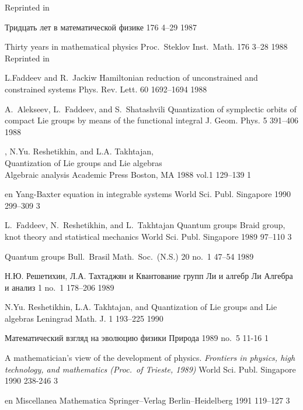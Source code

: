 Reprinted in 

{\LD}
{Тридцать лет в математической физике}
{\Trudy} {176} {} {4--29} {1987}

{\LF}
{Thirty years in mathematical physics}
{Proc.\ Steklov Inst.\ Math.} {176} {3--28} {1988} \\
Reprinted in 

{L.Faddeev and R.~Jackiw}
{Hamiltonian reduction of unconstrained and constrained systems}
{Phys. Rev. Lett.} {60} {} {1692--1694} {1988}

{A.~Alekseev, L.~Faddeev, and S.~Shatashvili}
{Quantization of symplectic orbits of compact {L}ie groups by means of
  the functional integral}
{J. Geom. Phys.} {5} {} {391--406} {1988}

{\LF, N.Yu. Reshetikhin, and L.A. Takhtajan,}\\
{Quantization of Lie groups and Lie algebras} \\
{Algebraic analysis} {Academic Press} {Boston, MA} {1988} {vol.1}
 {129--139} {1}

{en}
{Yang-Baxter equation in integrable systems}
{World Sci. Publ.} {Singapore} {1990} {} {299--309} {3}

{L.~Faddeev, N.~Reshetikhin, and L.~Takhtajan} 
{Quantum groups}
{Braid group, knot theory and statistical mechanics}
{World Sci. Publ.} {Singapore} {1989} {} {97--110} {3}

{\LF}
{Quantum groups}
{Bull.\ Brasil Math.\ Soc.\ (N.S.)} {20} {no.~1} {47--54} {1989} 

{Н.Ю. Решетихин, Л.А. Тахтаджян и \LD}
{Квантование групп Ли и алгебр Ли}
{Алгебра и анализ} {1} {no.~1} {178--206} {1989}

{N.Yu. Reshetikhin, L.A. Takhtajan, and \LF}
{Quantization of {L}ie groups and {L}ie algebras}
{Leningrad Math. J.} {1} {193--225} {1990}

{\LD}
{Математический взгляд на эволюцию физики}
{Природа} {} {} {1989} {no.~5} {11-16} {1}

{\LF}
{A mathematician's view of the development of physics.}  
{\em Frontiers in physics, high technology, and mathematics (Proc.\ of Trieste, 1989)}
{World Sci. Publ.} {Singapore} {1990} {} {238-246} {3}

{en}
{Miscellanea Mathematica} {Springer--Verlag} {Berlin--Heidelberg}
{1991} {} {119--127} {3}

